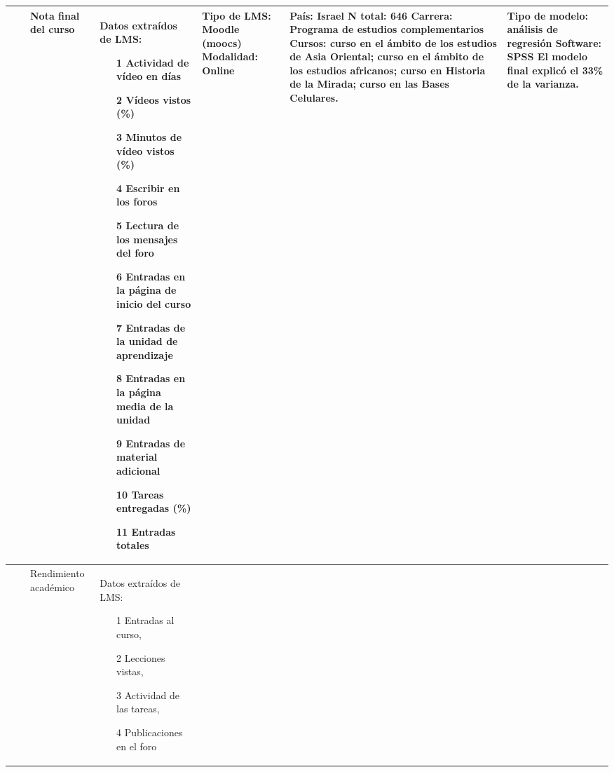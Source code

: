 \documentclass[spanish]{textolivre}
\begin{document}
\begin{small}
\begin{longtable}{
    >{\raggedright\arraybackslash}p{}
    p{}
    p{}
    p{}
    p{}
    p{}
    p{}
    }
\\
\midrule
9 & \cite{soffer2019} & Nota final del curso & Datos extraídos de LMS:
\begin{itemize}
\item[1] Actividad de vídeo en días
\item[2] Vídeos vistos (\%)
\item[3] Minutos de vídeo vistos (\%)
\item[4] Escribir en los foros
\item[5] Lectura de los mensajes del foro
\item[6] Entradas en la página de inicio del curso
\item[7] Entradas de la unidad de aprendizaje
\item[8] Entradas en la página media de la unidad
\item[9] Entradas de material adicional
\item[10] Tareas entregadas (\%)
\item[11] Entradas totales
\end{itemize} & Tipo de LMS: Moodle (moocs) \newline Modalidad:
Online & País: Israel \newline N total: 646 \newline Carrera: Programa de estudios complementarios \newline Cursos: curso en el ámbito de los estudios de Asia Oriental; curso en el ámbito de los estudios africanos; curso en Historia de la Mirada; curso en las Bases Celulares. & Tipo de modelo: análisis de regresión \newline Software: SPSS \newline El modelo final explicó el 33\% de la varianza.
\\
\midrule
10 & \cite{strang2016} & Rendimiento académico & Datos extraídos de LMS:
\begin{itemize}
\item[1] Entradas al curso,
\item[2] Lecciones vistas,
\item[3] Actividad de las tareas,
\item[4] Publicaciones en el foro
\end{itemize}


\end{longtable}
\end{small}
\end{document}
